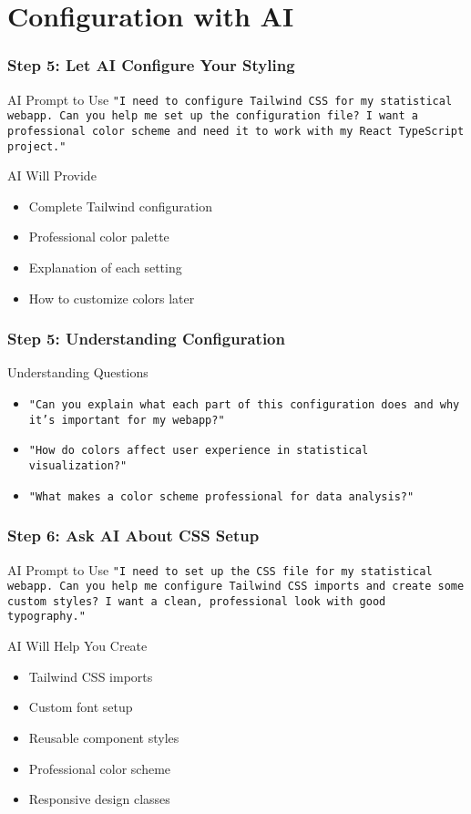 \documentclass[aspectratio=169]{beamer}
\begin{document}
\section{Configuration with AI}

\begin{frame}
\frametitle{Step 5: Let AI Configure Your Styling}
\begin{alertblock}{AI Prompt to Use}
\texttt{"I need to configure Tailwind CSS for my statistical webapp. Can you help me set up the configuration file? I want a professional color scheme and need it to work with my React TypeScript project."}
\end{alertblock}

\begin{exampleblock}{AI Will Provide}
\begin{itemize}
\item Complete Tailwind configuration
\item Professional color palette
\item Explanation of each setting
\item How to customize colors later
\end{itemize}
\end{exampleblock}
\end{frame}

\begin{frame}
\frametitle{Step 5: Understanding Configuration}
\begin{alertblock}{Understanding Questions}
\begin{itemize}
\item \texttt{"Can you explain what each part of this configuration does and why it's important for my webapp?"}
\item \texttt{"How do colors affect user experience in statistical visualization?"}
\item \texttt{"What makes a color scheme professional for data analysis?"}
\end{itemize}
\end{alertblock}
\end{frame}

\begin{frame}
\frametitle{Step 6: Ask AI About CSS Setup}
\begin{alertblock}{AI Prompt to Use}
\texttt{"I need to set up the CSS file for my statistical webapp. Can you help me configure Tailwind CSS imports and create some custom styles? I want a clean, professional look with good typography."}
\end{alertblock}

\begin{exampleblock}{AI Will Help You Create}
\begin{itemize}
\item Tailwind CSS imports
\item Custom font setup
\item Reusable component styles
\item Professional color scheme
\item Responsive design classes
\end{itemize}
\end{exampleblock}
\end{frame}
\end{document}
